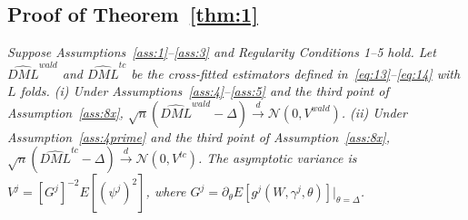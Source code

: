 \begin{propproof}
\end{propproof}

\subsection{Proof of Theorem~\ref{thm:1}}\label{sec:app_proofs_thm1}
\noindent \textit{Suppose Assumptions~\ref{ass:1}--\ref{ass:3} and Regularity Conditions 1--5 hold. Let $\widehat{DML}^{wald}$ and $\widehat{DML}^{tc}$ be the cross-fitted estimators defined in~\eqref{eq:13}--\eqref{eq:14} with $L$ folds. (i) Under Assumptions~\ref{ass:4}--\ref{ass:5} and the third point of Assumption~\ref{ass:8x}, $\sqrt{n}(\widehat{DML}^{wald} - \Delta) \xrightarrow{d} \mathcal{N}(0, V^{wald})$. (ii) Under Assumption~\ref{ass:4prime} and the third point of Assumption~\ref{ass:8x}, $\sqrt{n}(\widehat{DML}^{tc} - \Delta) \xrightarrow{d} \mathcal{N}(0, V^{tc})$. The asymptotic variance is $V^j=[G^j]^{-2}E[(\psi^j)^2]$, where $G^j=\partial_\theta E[g^j(W,\gamma^j,\theta)]|_{\theta=\Delta}$.}

